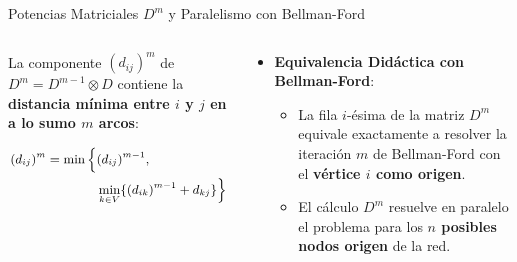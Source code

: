 \documentclass[
  ignorenonframetext,
]{beamer}
\providecommand{\tightlist}{%
  \setlength{\itemsep}{0pt}\setlength{\parskip}{0pt}}
\begin{document}
\begin{frame}{Potencias Matriciales \(D^m\) y Paralelismo con
Bellman-Ford}
\label{potencias-matriciales-dm-y-paralelismo-con-bellman-ford}
\begin{columns}[T]
\begin{column}{0.52\linewidth}
\begin{tcolorbox}[enhanced jigsaw, colframe=quarto-callout-note-color-frame, toptitle=1mm, colback=white, colbacktitle=quarto-callout-note-color!10!white, titlerule=0mm, breakable, coltitle=black, opacityback=0, bottomrule=.15mm, title=\textcolor{quarto-callout-note-color}{\faInfo}\hspace{0.5em}{Relación de recurrencia en álgebra Min-Suma}, rightrule=.15mm, arc=.35mm, leftrule=.75mm, left=2mm, toprule=.15mm, bottomtitle=1mm, opacitybacktitle=0.6]

La componente \((d_{ij})^m\) de \(D^m = D^{m-1} \otimes D\) contiene la
\textbf{distancia mínima entre \(i\) y \(j\) en a lo sumo \(m\) arcos}:

\[ \small
\begin{aligned}
(d_{ij})^{m} = \min \Big\{ & (d_{ij})^{m-1}, \\
& \min_{k \in V} \{ (d_{ik})^{m-1} + d_{kj} \} \Big\}
\end{aligned}
\]

\end{tcolorbox}
\end{column}

\begin{column}{0.48\linewidth}
\begin{itemize}
\tightlist
\item
  \textbf{Equivalencia Didáctica con Bellman-Ford}:

  \begin{itemize}
  \tightlist
  \item
    La fila \(i\)-ésima de la matriz \(D^m\) equivale exactamente a
    resolver la iteración \(m\) de Bellman-Ford con el \textbf{vértice
    \(i\) como origen}.
  \item
    El cálculo \(D^m\) resuelve en paralelo el problema para los
    \textbf{\(n\) posibles nodos origen} de la red.
  \end{itemize}
\end{itemize}
\end{column}
\end{columns}
\end{frame}
\end{document}
